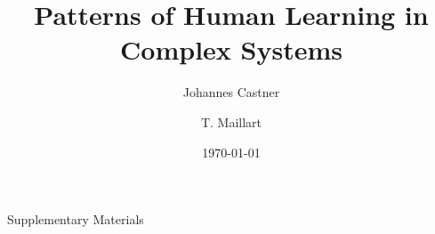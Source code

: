 \documentclass[12pt]{revtex4}
\begin{document}
\title{Patterns of Human Learning in Complex Systems}


\author{Johannes Castner}

\author{T. Maillart}



\date{\today}


\begin{abstract}

\end{abstract}

\maketitle



%








\clearpage


\clearpage
%

\renewcommand\thesection{\alph{section}}
\setcounter{section}{0}

\begin{center}
{\Large Supplementary Materials}
\vspace{3cm}
\end{center}


\end{document}
